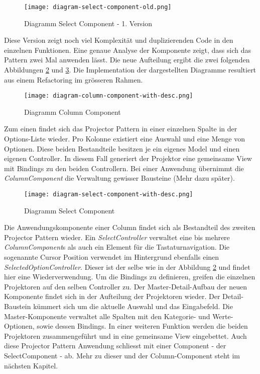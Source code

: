 \begin{figure}[!htb]
    \centering
    \texttt{[image: diagram-select-component-old.png]}
    \caption{Diagramm Select Component - 1. Version}
    \label{img:DiagramSelectComponentOld}
\end{figure}

Diese Version zeigt noch viel Komplexität und duplizierenden Code in den einzelnen Funktionen.
Eine genaue Analyse der Komponente zeigt, dass sich das Pattern zwei Mal anwenden lässt.
Die neue Aufteilung ergibt die zwei folgenden Abbildungen \ref{img:DiagramColumnComponent} und \ref{img:DiagramSelectComponent}.
Die Implementation der dargestellten Diagramme resultiert aus einem Refactoring im grösseren Rahmen.

\begin{figure}[!htb]
    \centering
    \texttt{[image: diagram-column-component-with-desc.png]}
    \caption{Diagramm Column Component}
    \label{img:DiagramColumnComponent}
\end{figure}

Zum einen findet sich das Projector Pattern in einer einzelnen Spalte in der Options-Liste wieder.
Pro Kolonne existiert eine Auswahl und eine Menge von Optionen.
Diese beiden Bestandteile besitzen je ein eigenes Model und einen eigenen Controller.
In diesem Fall generiert der Projektor eine gemeinsame View mit Bindings zu den beiden Controllern.
Bei einer Anwendung übernimmt die \emph{ColumnComponent} die Verwaltung gewisser Bausteine (Mehr dazu später).

\begin{figure}[!htb]
    \centering
    \texttt{[image: diagram-select-component-with-desc.png]}
    \caption{Diagramm Select Component}
    \label{img:DiagramSelectComponent}
\end{figure}

Die Anwendungskomponente einer Column findet sich als Bestandteil des zweiten Projector Pattern wieder.
Ein \emph{SelectController} verwaltet eine bis mehrere \emph{ColumnComponent}s als auch ein Element für die Tastaturnavigation.
Die sogenannte Cursor Position verwendet im Hintergrund ebenfalls einen \emph{SelectedOptionController}. 
Dieser ist der selbe wie in der Abbildung \ref{img:DiagramColumnComponent} und findet hier eine Wiederverwendung.
Um die Bindings zu definieren, greifen die einzelnen Projektoren auf den selben Controller zu.
Der Master-Detail-Aufbau der neuen Komponente findet sich in der Aufteilung der Projektoren wieder.
Der Detail-Baustein kümmert sich um die aktuelle Auswahl und das Eingabefeld.
Die Master-Komponente verwaltet alle Spalten mit den Kategorie- und Werte-Optionen, sowie dessen Bindings.
In einer weiteren Funktion werden die beiden Projektoren zusammengeführt und in eine gemeinsame View eingebettet.
Auch diese Projector Pattern Anwendung schliesst mit einer Component - der SelectComponent - ab.
Mehr zu dieser und der Column-Component steht im nächsten Kapitel.


